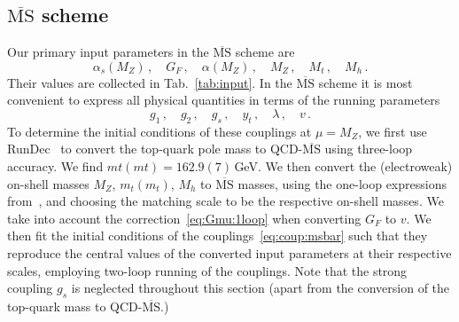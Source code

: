 \documentclass[letter,11pt,DIV=12,abstract=true,numbers=noenddot,titlepage=false,twocolumn=false,draft=false]{scrartcl}
\newcommand{\MS}{$\overline{\text{MS}}$}
\begin{document}
\subsection{\MS{} scheme}\label{sec:msbar}

Our primary input parameters in the \MS{} scheme are
\begin{equation}
  \alpha_s(M_Z)\,, \quad G_F\,, \quad \alpha(M_Z)\,, \quad M_Z\,, \quad M_t\,, \quad M_h\,.
\end{equation}
Their values are collected in Tab.~\ref{tab:input}. In the \MS{}
scheme it is most convenient to express all physical quantities in
terms of the running parameters
\begin{equation}\label{eq:coup:msbar}
  g_1\,, \quad g_2\,, \quad g_s\,, \quad y_t\,, \quad \lambda\,, \quad v\,.
\end{equation}
To determine the initial conditions of these couplings at $\mu = M_Z$,
we first use RunDec~\cite{Chetyrkin:2000yt} to convert the top-quark
pole mass to QCD-\MS{} using three-loop accuracy. We find $mt(mt) =
162.9(7)\,$GeV. We then convert the (electroweak) on-shell masses
$M_Z$, $m_t(m_t)$, $M_h$ to \MS{} masses, using the one-loop
expressions from~\cite{Jegerlehner:2001fb, Jegerlehner:2002em}, and
choosing the matching scale to be the respective on-shell masses. We
take into account the correction~\eqref{eq:Gmu:1loop} when converting
$G_F$ to $v$. We then fit the initial conditions of the
couplings~\eqref{eq:coup:msbar} such that they reproduce the central
values of the converted input parameters at their respective scales,
employing two-loop running of the couplings. Note that the strong
coupling $g_s$ is neglected throughout this section (apart from the
conversion of the top-quark mass to QCD-\MS{}.)
\end{document}
